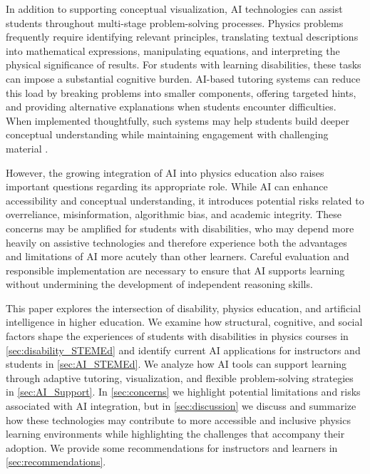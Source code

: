 \documentclass[]{aastex701}
\begin{document}
In addition to supporting conceptual visualization, AI technologies can assist students throughout multi-stage problem-solving processes. Physics problems frequently require identifying relevant principles, translating textual descriptions into mathematical expressions, manipulating equations, and interpreting the physical significance of results. For students with learning disabilities, these tasks can impose a substantial cognitive burden. AI-based tutoring systems can reduce this load by breaking problems into smaller components, offering targeted hints, and providing alternative explanations when students encounter difficulties. When implemented thoughtfully, such systems may help students build deeper conceptual understanding while maintaining engagement with challenging material \autocite{Paglialunga2025, Sweller2011}.

However, the growing integration of AI into physics education also raises important questions regarding its appropriate role. While AI can enhance accessibility and conceptual understanding, it introduces potential risks related to overreliance, misinformation, algorithmic bias, and academic integrity. These concerns may be amplified for students with disabilities, who may depend more heavily on assistive technologies and therefore experience both the advantages and limitations of AI more acutely than other learners. Careful evaluation and responsible implementation are necessary to ensure that AI supports learning without undermining the development of independent reasoning skills.

This paper explores the intersection of disability, physics education, and artificial intelligence in higher education. We examine how structural, cognitive, and social factors shape the experiences of students with disabilities in physics courses in \autoref{sec:disability_STEMEd} and identify current AI applications for instructors and students in \autoref{sec:AI_STEMEd}. We analyze how AI tools can support learning through adaptive tutoring, visualization, and flexible problem-solving strategies in \autoref{sec:AI_Support}. In \autoref{sec:concerns} we highlight potential limitations and risks associated with AI integration, but in \autoref{sec:discussion} we discuss and summarize how these technologies may contribute to more accessible and inclusive physics learning environments while highlighting the challenges that accompany their adoption. We provide some recommendations for instructors and learners in \autoref{sec:recommendations}.
\end{document}
